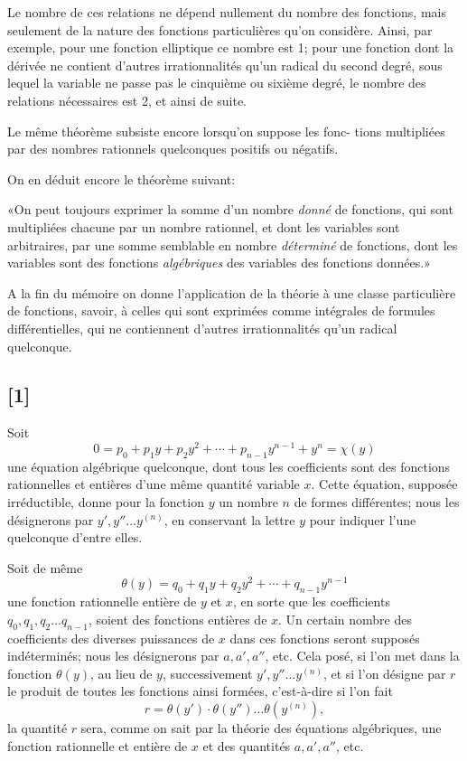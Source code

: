 \documentclass{article}
\begin{document}
Le nombre de ces relations ne dépend nullement du nombre des fonctions, mais seulement de la nature des fonctions particulières qu'on considère. Ainsi, par exemple, pour une fonction elliptique ce nombre est 1; pour une fonction dont la dérivée ne contient d'autres irrationnalités qu'un radical du second degré, sous lequel la variable ne passe pas le cinquième ou sixième degré, le nombre des relations nécessaires est 2, et ainsi de suite.

Le même théorème subsiste encore lorsqu'on suppose les fonc-
tions multipliées par des nombres rationnels quelconques positifs ou négatifs.

On en déduit encore le théorème suivant:

«On peut toujours exprimer la somme d'un nombre \emph{donné} de fonctions, qui sont multipliées chacune par un nombre rationnel, et dont les variables sont arbitraires, par une somme semblable en nombre \emph{déterminé} de fonctions, dont les variables sont des fonctions \emph{algébriques} des variables des fonctions données.»

A la fin du mémoire on donne l'application de la théorie à une classe particulière de fonctions, savoir, à celles qui sont exprimées comme intégrales de formules différentielles, qui ne contiennent d'autres irrationnalités qu'un radical quelconque.

\subsection*{[1]}

Soit
\[ 0 = p_0 + p_1 y + p_2 y^{2} + \cdots + p_{n-1} y^{n-1} + y^{n} = \chi(y) \tag{1} \]
une équation algébrique quelconque, dont tous les coefficients sont des fonctions rationnelles et entières d'une même quantité variable $x$. Cette équation, supposée irréductible, donne pour la fonction $y$ un nombre $n$ de formes différentes; nous les désignerons par $y', y'' \ldots y^{(n)}$, en conservant la lettre $y$ pour indiquer l'une quelconque d'entre elles.

Soit de même
\[ \theta(y) = q_0 + q_1 y + q_2 y^{2} + \cdots + q_{n-1} y^{n-1} \tag{2} \]
une fonction rationnelle entière de $y$ et $x$, en sorte que les coefficients $q_0, q_1, q_2 \ldots q_{n-1}$, soient des fonctions entières de $x$. Un certain nombre des coefficients des diverses puissances de $x$ dans ces fonctions seront supposés indéterminés; nous les désignerons par $a, a', a''$, etc.
Cela posé, si l'on met dans la fonction $\theta(y)$, au lieu de $y$, successivement $y', y'' \ldots y^{(n)}$, et si l'on désigne par $r$ le produit de toutes les fonctions ainsi formées, c'est-à-dire si l'on fait
\[ r = \theta(y') \cdot \theta(y'') \ldots \theta(y^{(n)}), \tag{3} \]
la quantité $r$ sera, comme on sait par la théorie des équations algébriques, une fonction rationnelle et entière de $x$ et des quantités $a, a', a''$, etc.
\end{document}

